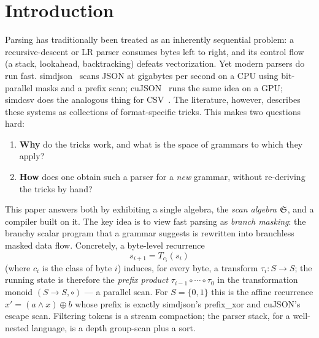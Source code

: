 \section{Introduction}
\label{sec:intro}

Parsing has traditionally been treated as an inherently sequential problem: a
recursive-descent or LR parser consumes bytes left to right, and its control
flow (a stack, lookahead, backtracking) defeats vectorization.  Yet modern
parsers do run fast.  \textsf{simdjson}~\cite{simdjson} scans JSON at gigabytes
per second on a CPU using bit-parallel masks and a prefix scan;
\textsf{cuJSON}~\cite{cujson} runs the same idea on a GPU; \textsf{simdcsv}
does the analogous thing for CSV~\cite{simdcsv}.  The literature, however,
describes these systems as collections of format-specific tricks.  This makes
two questions hard:
\begin{enumerate}
  \item \textbf{Why} do the tricks work, and what is the space of grammars to
        which they apply?
  \item \textbf{How} does one obtain such a parser for a \emph{new} grammar,
        without re-deriving the tricks by hand?
\end{enumerate}

This paper answers both by exhibiting a single algebra, the \emph{scan algebra} $\mathfrak{S}$, and
a compiler built on it.  The key idea is to view fast parsing as
\emph{branch masking}: the branchy scalar program that a grammar suggests is
rewritten into branchless masked data flow.  Concretely, a byte-level
recurrence
\[
  s_{i+1} = T_{c_i}(s_i)
\]
(where $c_i$ is the class of byte $i$) induces, for every byte, a transform
$\tau_i : S \to S$; the running state is therefore the \emph{prefix product}
$\tau_{i-1}\circ\cdots\circ\tau_0$ in the transformation monoid $(S\to S,\circ)$
--- a parallel scan.  For $S=\{0,1\}$ this is the affine recurrence
$x' = (a\wedge x)\oplus b$ whose prefix is exactly
\textsf{simdjson}'s \textsf{prefix\_xor} and \textsf{cuJSON}'s escape scan.
Filtering tokens is a stream compaction; the parser stack, for a well-nested
language, is a depth group-scan plus a sort.

